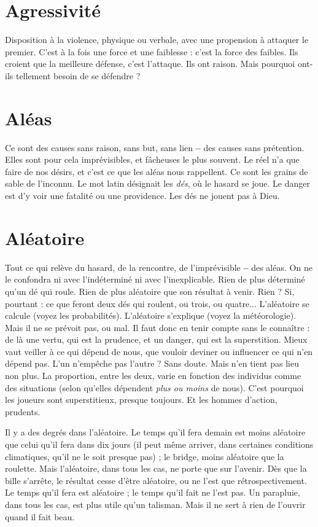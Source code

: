 \section{Agressivité}
Disposition à la violence, physique ou verbale, avec une propension
à attaquer le premier. C’est à la fois une force et une
faiblesse : c’est la force des faibles. Ils croient que la meilleure défense, c’est
l'attaque. Ils ont raison. Mais pourquoi ont-ils tellement besoin de se défendre ?

\section{Aléas}
Ce sont des causes sans raison, sans but, sans lien {\bf --} des causes sans
prétention. Elles sont pour cela imprévisibles, et fâcheuses le plus
souvent. Le réel n’a que faire de nos désirs, et c’est ce que les aléas nous rappellent.
Ce sont les grains de sable de l'inconnu. Le mot latin désignait les {\it dés}, où
le hasard se joue. Le danger est d’y voir une fatalité ou une providence. Les dés
ne jouent pas à Dieu.

\section{Aléatoire}
Tout ce qui relève du hasard, de la rencontre, de l’imprévisible
{\bf --} des aléas. On ne le confondra ni avec l’indéterminé ni avec
l’inexplicable. Rien de plus déterminé qu’un dé qui roule. Rien de plus aléatoire
que son résultat à venir. Rien ? Si, pourtant : ce que feront deux dés qui
roulent, ou trois, ou quatre... L’aléatoire se calcule (voyez les probabilités).
L’aléatoire s'explique (voyez la météorologie). Mais il ne se prévoit pas, ou mal.
Il faut donc en tenir compte sans le connaître : de là une vertu, qui est la prudence,
et un danger, qui est la superstition. Mieux vaut veiller à ce qui dépend
de nous, que vouloir deviner ou influencer ce qui n’en dépend pas. L’un
n'empêche pas l’autre ? Sans doute. Mais n’en tient pas lieu non plus. La proportion,
entre les deux, varie en fonction des individus comme des situations
(selon qu’elles dépendent {\it plus ou moins} de nous). C’est pourquoi les joueurs
sont superstitieux, presque toujours. Et les hommes d’action, prudents.

Il y a des degrés dans l’aléatoire. Le temps qu’il fera demain est moins aléatoire
que celui qu’il fera dans dix jours (il peut même arriver, dans certaines
conditions climatiques, qu’il ne le soit presque pas) ; le bridge, moins aléatoire
que la roulette. Mais l’aléatoire, dans tous les cas, ne porte que sur l’avenir. Dès
que la bille s'arrête, le résultat cesse d’être aléatoire, ou ne l’est que rétrospectivement.
Le temps qu’il fera est aléatoire ; le temps qu’il fait ne l’est pas. Un
parapluie, dans tous les cas, est plus utile qu’un talisman. Mais il ne sert à rien
de l’ouvrir quand il fait beau.

